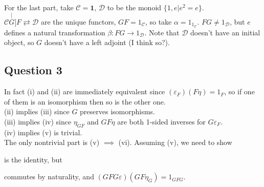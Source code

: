 \documentclass[a4paper]{article}
\begin{document}
For the last part, take $\mathcal{C} = \mathbf{1}$, $\mathcal{D}$ to be the monoid $\{1,e|e^2 = e\}$.\\
$\mathcal{C} \stackrel[G]{F}{\rightleftarrows} \mathcal{D}$ are the unique functors, $GF=1_{\mathcal{C}}$, so take $\alpha = 1_{1_{\mathcal{C}}}$. $FG \neq 1_\mathcal{D}$, but $e$ defines a natural transformation $\beta:FG \to 1_\mathcal{D}$. Note that $\mathcal{D}$ doesn't have an initial object, so $G$ doesn't have a left adjoint (I think so?).

\subsection{Question 3}
In fact (i) and (ii) are immediately equivalent since $(\varepsilon_F) (F\eta) = 1_F$, so if one of them is an isomorphism then so is the other one.\\
(ii) implies (iii) since $G$ preserves isomorphisms.\\
(iii) implies (iv) since $\eta_{GF}$ and $GF\eta$ are both 1-sided inverses for $G\varepsilon_F$.\\
(iv) implies (v) is trivial.\\
The only nontrivial part is (v) $\implies$ (vi). Assuming (v), we need to show
is the identity, but 
commutes by naturality, and $(GFG\varepsilon)(GF\eta_G) = 1_{GFG}$.
\end{document}
